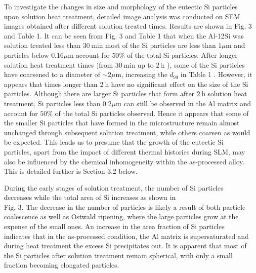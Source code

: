 \documentclass[10pt]{article}
\begin{document}
To investigate the changes in size and morphology of the eutectic Si particles upon solution heat treatment, detailed image analysis was conducted on SEM images obtained after different solution treated times. Results are shown in Fig. 3 and Table 1. It can be seen from Fig. 3 and Table 1 that when the Al-12Si was solution treated less than $30 \mathrm{~min}$ most of the Si particles are less than $1 \mu \mathrm{m}$ and particles below $0.16 \mu \mathrm{m}$ account for $50 \%$ of the total Si particles. After longer solution heat treatment times (from $30 \mathrm{~min}$ up to $2 \mathrm{~h}$ ), some of the Si particles have coarsened to a diameter of $\sim 2 \mu \mathrm{m}$, increasing the $d_{90}$ in Table 1 . However, it appears that times longer than $2 \mathrm{~h}$ have no significant effect on the size of the Si particles. Although there are larger Si particles that form after $2 \mathrm{~h}$ solution heat treatment, Si particles less than $0.2 \mu \mathrm{m}$ can still be observed in the $\mathrm{Al}$ matrix and account for $50 \%$ of the total Si particles observed. Hence it appears that some of the smaller Si particles that have formed in the microstructure remain almost unchanged through subsequent solution treatment, while others coarsen as would be expected. This leads us to presume that the growth of the eutectic Si particles, apart from the impact of different thermal histories during SLM, may also be influenced by the chemical inhomogeneity within the as-processed alloy. This is detailed further is Section 3.2 below.

During the early stages of solution treatment, the number of $\mathrm{Si}$ particles decreases while the total area of $\mathrm{Si}$ increases as shown in\\
Fig. 3. The decrease in the number of particles is likely a result of both particle coalescence as well as Ostwald ripening, where the large particles grow at the expense of the small ones. An increase in the area fraction of $\mathrm{Si}$ particles indicates that in the as-processed condition, the $\mathrm{Al}$ matrix is supersaturated and during heat treatment the excess Si precipitates out. It is apparent that most of the Si particles after solution treatment remain spherical, with only a small fraction becoming elongated particles.
\end{document}
